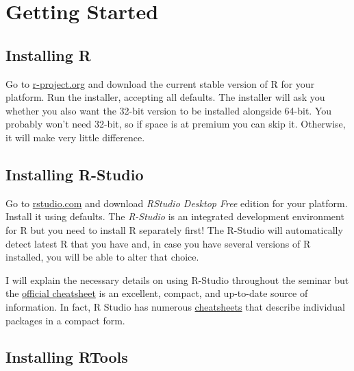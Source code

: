 \documentclass[
]{book}
\begin{document}
\hypertarget{getting-started}{%
\chapter*{Getting Started}\label{getting-started}}

\hypertarget{installing-r}{%
\section*{Installing R}\label{installing-r}}

Go to \href{https://cloud.r-project.org/}{r-project.org} and download the current stable version of R for your platform. Run the installer, accepting all defaults. The installer will ask you whether you also want the 32-bit version to be installed alongside 64-bit. You probably won't need 32-bit, so if space is at premium you can skip it. Otherwise, it will make very little difference.

\hypertarget{installing-r-studio}{%
\section*{Installing R-Studio}\label{installing-r-studio}}

Go to \href{https://rstudio.com/products/rstudio/download/}{rstudio.com} and download \emph{RStudio Desktop Free} edition for your platform. Install it using defaults. The \emph{R-Studio} is an integrated development environment for R but you need to install R separately first! The R-Studio will automatically detect latest R that you have and, in case you have several versions of R installed, you will be able to alter that choice.

I will explain the necessary details on using R-Studio throughout the seminar but the \href{https://github.com/rstudio/cheatsheets/raw/master/rstudio-ide.pdf}{official cheatsheet} is an excellent, compact, and up-to-date source of information. In fact, R Studio has numerous \href{https://rstudio.com/resources/cheatsheets/}{cheatsheets} that describe individual packages in a compact form.

\hypertarget{rtools}{%
\section*{Installing RTools}\label{rtools}}
\end{document}
